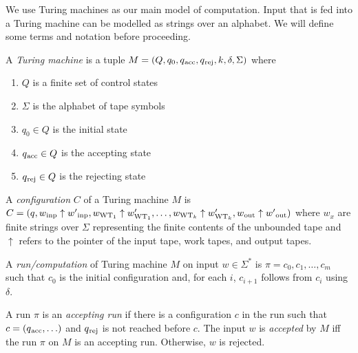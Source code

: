 \documentclass[11pt,usenames, dvipsnames]{article}
\begin{document}
We use Turing machines as our main model of computation. Input that is fed into a Turing machine can be modelled as strings over an alphabet. We will define some terms and notation before proceeding.

\begin{definition}
  A \emph{Turing machine} is a tuple $M = (Q, q_0, q\textsubscript{acc}, q\textsubscript{rej}, k, \delta, \Sigma)$ where
  \begin{enumerate}
    \item $Q$ is a finite set of control states
    \item $\Sigma$ is the alphabet of tape symbols
    \item $q_0 \in Q$ is the initial state
    \item $q\textsubscript{acc} \in Q$ is the accepting state
    \item $q\textsubscript{rej} \in Q$ is the rejecting state
  \end{enumerate}
\end{definition}

\begin{definition}[Configuration]
  A \emph{configuration} $C$ of a Turing machine $M$ is $C = (q, w\textsubscript{inp} \uparrow w'\textsubscript{inp}, w_{\text{WT}_1} \uparrow w'_{\text{WT}_1}, \ldots, w_{\text{WT}_k} \uparrow w'_{\text{WT}_k}, w\textsubscript{out} \uparrow w'\textsubscript{out})$ where $w_x$ are finite strings over $\Sigma$ representing the finite contents of the unbounded tape and $\uparrow$ refers to the pointer of the input tape, work tapes, and output tapes.
\end{definition}

\begin{definition}
  A \emph{run/computation} of Turing machine $M$ on input $w \in \Sigma^*$ is $\pi = c_0, c_1, \ldots, c_m$ such that $c_0$ is the initial configuration and, for each $i$, $c_{i+1}$ follows from $c_i$ using $\delta$.
\end{definition}

\begin{definition}
  A run $\pi$ is an \emph{accepting run} if there is a configuration $c$ in the run such that $c = (q\textsubscript{acc}, \ldots)$ and $q\textsubscript{rej}$ is not reached before $c$. The input $w$ is \emph{accepted} by $M$ iff the run $\pi$ on $M$ is an accepting run. Otherwise, $w$ is rejected.
\end{definition}
\end{document}
